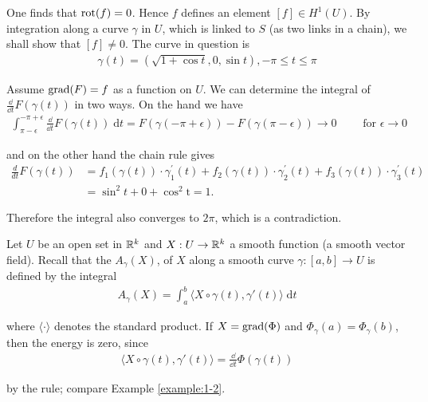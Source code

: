 One finds that $\operatorname{rot}(f) = 0$. Hence $f$ defines an element $[f] \in H^1(U)$. By
integration along a curve $\gamma$ in $U$, which is linked to $S$ (as two links in a chain),
we shall show that $[f] \neq 0$. The curve in question is
\begin{align*}
  \gamma(t) = \left(\sqrt{1+\cos t}, 0, \sin t\right), -\pi\le t\le \pi
\end{align*}

Assume $\operatorname{grad}(F) = f$ as a function on $U$. We can determine the integral of 
$\frac{\dd }{\dd t}F(\gamma(t))$ in two ways. On the hand we have
\begin{align*}
  \int_{\pi-\epsilon}^{-\pi+\epsilon}{\frac{\dd }{\dd t}F(\gamma(t)) \;\mathrm{d}t}
  = F(\gamma(-\pi+\epsilon)) - F(\gamma(\pi-\epsilon))
  \to 0\qquad \text{ for } \epsilon\to 0
\end{align*}

and on the other hand the chain rule gives
\begin{align*}
  \frac{d}{dt}F(\gamma(t))
  & = f_{1}(\gamma(t)) \cdot\gamma_{1}^{\prime}(t)+f_{2}(\gamma(t))\cdot\gamma_{2}^{\prime}(t)+f_{3}(\gamma(t))\cdot \gamma_{3}^{\prime}(t) \\
  & = \sin^{2}t+0+\cos^{2}\mathrm{t}=1.
\end{align*}

Therefore the integral also converges to $2\pi$, which is a contradiction.

\begin{example}\label{example:1-8}
  Let $U$ be an open set in $\mathbb{R}^k$ and $X: U\to \mathbb{R}^k$ a smooth function (a smooth vector field). 
Recall that the  $A_\gamma(X)$, of $X$ along a smooth curve $\gamma: [a, b]\to U$ is 
defined by the integral
\begin{align*}
  A_\gamma(X) = \int_{a}^{b}{\langle X\circ \gamma(t), \gamma'(t)\rangle\;\mathrm{d}t}
\end{align*}

where $\langle\cdot\rangle$ denotes the standard product. If $X = \operatorname{grad}(\Phi)$ and $\Phi_\gamma(a) = \Phi_\gamma(b)$,
then the energy is zero, since 
\begin{align*}
  \langle X\circ \gamma(t), \gamma'(t)\rangle = \frac{\dd }{\dd t}\Phi(\gamma(t))
\end{align*}

by the rule; compare Example \ref{example:1-2}.
\end{example}